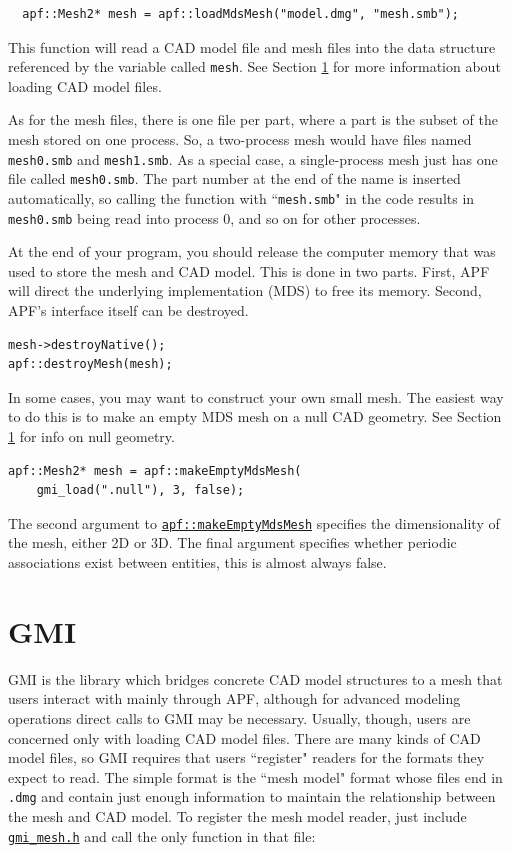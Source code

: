 \documentclass{article}
\begin{document}
\begin{lstlisting}
  apf::Mesh2* mesh = apf::loadMdsMesh("model.dmg", "mesh.smb");
\end{lstlisting}

This function will read a CAD model file and mesh files into
the data structure referenced by the variable called \texttt{mesh}.
See Section \ref{sec:gmi} for more information about loading
CAD model files.

As for the mesh files, there is one file per part, where a
part is the subset of the mesh stored on one process.
So, a two-process mesh would have files named \texttt{mesh0.smb}
and \texttt{mesh1.smb}.
As a special case, a single-process mesh just has one file
called \texttt{mesh0.smb}.
The part number at the end of the name is inserted automatically,
so calling the function with ``\texttt{mesh.smb}" in the code
results in \texttt{mesh0.smb} being read into process 0, and so
on for other processes.

At the end of your program, you should release the computer
memory that was used to store the mesh and CAD model.
This is done in two parts.
First, APF will direct the underlying implementation (MDS)
to free its memory.
Second, APF's interface itself can be destroyed.

\begin{lstlisting}
mesh->destroyNative();
apf::destroyMesh(mesh);
\end{lstlisting}

In some cases, you may want to construct your own small mesh.
The easiest way to do this is to make an empty MDS mesh
on a null CAD geometry.
See Section \ref{sec:gmi} for info on null geometry.

\begin{lstlisting}
apf::Mesh2* mesh = apf::makeEmptyMdsMesh(
    gmi_load(".null"), 3, false);
\end{lstlisting}

The second argument to
\href{http://scorec.rpi.edu/~dibanez/core/namespaceapf.html#a11b743b52ed63a172a9f6bf5f29e2054}{\texttt{apf::makeEmptyMdsMesh}}
specifies the dimensionality of the mesh, either 2D or 3D.
The final argument specifies whether periodic associations
exist between entities, this is almost always false.

\section{GMI}
\label{sec:gmi}

GMI is the library which bridges concrete CAD model structures
to a mesh that users interact with mainly through APF, although
for advanced modeling operations direct calls to GMI may be necessary.
Usually, though, users are concerned only with loading CAD model
files.
There are many kinds of CAD model files, so GMI requires that users
``register" readers for the formats they expect to read.
The simple format is the ``mesh model" format whose files end in
\texttt{.dmg} and contain just enough information to maintain
the relationship between the mesh and CAD model.
To register the mesh model reader, just include
\href{https://github.com/SCOREC/core/blob/master/gmi/gmi_mesh.h}{\texttt{gmi\_mesh.h}}
and call the only function in that file:
\end{document}
